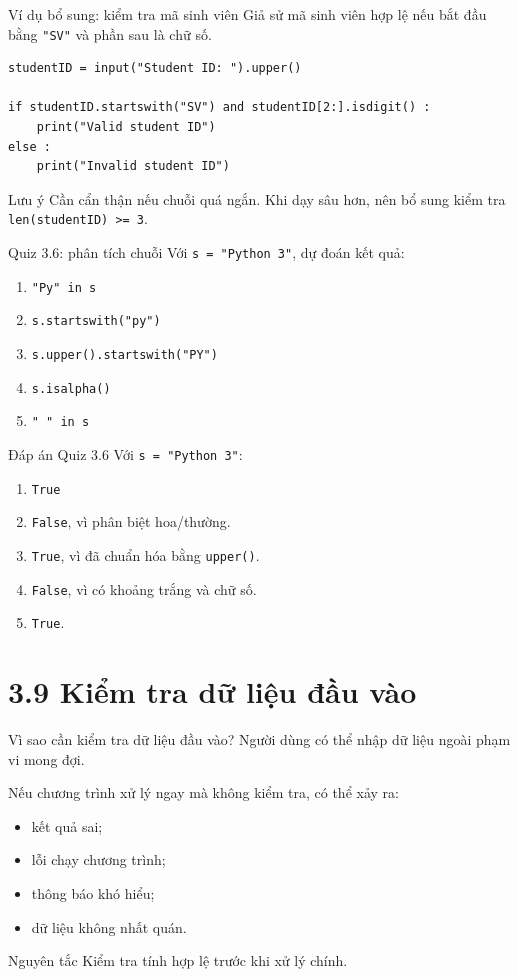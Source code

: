 \documentclass[aspectratio=169,11pt]{beamer}
\newcommand{\code}[1]{\texttt{#1}}
\newcommand{\smallgap}{\vspace{0.4em}}
\begin{document}
\begin{frame}[fragile]{Ví dụ bổ sung: kiểm tra mã sinh viên}
Giả sử mã sinh viên hợp lệ nếu bắt đầu bằng \code{"SV"} và phần sau là chữ số.
\begin{lstlisting}[style=py]
studentID = input("Student ID: ").upper()

if studentID.startswith("SV") and studentID[2:].isdigit() :
    print("Valid student ID")
else :
    print("Invalid student ID")
\end{lstlisting}
\begin{alertblock}{Lưu ý}
Cần cẩn thận nếu chuỗi quá ngắn. Khi dạy sâu hơn, nên bổ sung kiểm tra \code{len(studentID) >= 3}.
\end{alertblock}
\end{frame}

\begin{frame}{Quiz 3.6: phân tích chuỗi}
Với \code{s = "Python 3"}, dự đoán kết quả:
\begin{enumerate}
  \item \code{"Py" in s}
  \item \code{s.startswith("py")}
  \item \code{s.upper().startswith("PY")}
  \item \code{s.isalpha()}
  \item \code{" " in s}
\end{enumerate}
\end{frame}

\begin{frame}{Đáp án Quiz 3.6}
Với \code{s = "Python 3"}:
\begin{enumerate}
  \item \code{True}
  \item \code{False}, vì phân biệt hoa/thường.
  \item \code{True}, vì đã chuẩn hóa bằng \code{upper()}.
  \item \code{False}, vì có khoảng trắng và chữ số.
  \item \code{True}.
\end{enumerate}
\end{frame}

\section{3.9 Kiểm tra dữ liệu đầu vào}

\begin{frame}{Vì sao cần kiểm tra dữ liệu đầu vào?}
Người dùng có thể nhập dữ liệu ngoài phạm vi mong đợi.\smallgap

Nếu chương trình xử lý ngay mà không kiểm tra, có thể xảy ra:
\begin{itemize}
  \item kết quả sai;
  \item lỗi chạy chương trình;
  \item thông báo khó hiểu;
  \item dữ liệu không nhất quán.
\end{itemize}
\begin{block}{Nguyên tắc}
Kiểm tra tính hợp lệ trước khi xử lý chính.
\end{block}
\end{frame}
\end{document}
